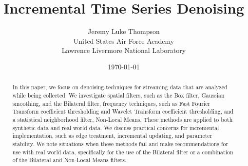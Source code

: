 \documentclass[11pt]{article}
\theoremstyle{definition}
\begin{document}
\title{Incremental Time Series Denoising}

\date{\today}

%

\author{Jeremy Luke Thompson \\
United States Air Force Academy \\
Lawrence Livermore National Laboratory
}

\begin{titlepage}
\maketitle
\end{titlepage}

\tableofcontents

\newpage

\listoffigures

\newpage

\lstlistoflistings

\newpage


\begin{abstract}
In this paper, we focus on denoising techniques for streaming data that are analyzed while being collected. We investigate spatial filters, such as the Box filter, Gaussian smoothing, and the Bilateral filter, frequency techniques, such as Fast Fourier Transform coefficient thresholding and Wavelet Transform coefficient thresholding, and a statistical neighborhood filter, Non-Local Means. These methods are applied to both synthetic data and real world data. We discuss practical concerns for incremental implementation, such as edge treatment, incremental updating, and parameter stability. We note situations when these methods fail and make recommendations for use with real world data, specifically for the use of the Bilateral filter or a combination of the Bilateral and Non-Local Means filters.
\end{abstract}






\pagestyle{plain}


\end{document}
